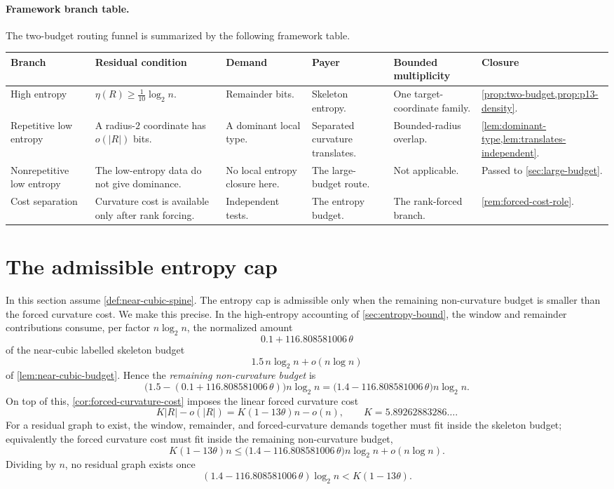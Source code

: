 \documentclass[11pt]{article}
\newcommand{\FrameworkBranchTableHeader}{%
\toprule
\textbf{Branch} & \textbf{Residual condition} & \textbf{Demand} & \textbf{Payer} & \textbf{Bounded multiplicity} & \textbf{Closure}\\
\midrule
}
\begin{document}
\paragraph{Framework branch table.}
The two-budget routing funnel is summarized by the following framework table.
\begin{longtable}{L{0.13\textwidth} L{0.19\textwidth} L{0.14\textwidth} L{0.14\textwidth} L{0.17\textwidth} L{0.17\textwidth}}
\FrameworkBranchTableHeader
High entropy
&
\(\eta(R)\ge\frac1{10}\log_2 n\).
&
Remainder bits.
&
Skeleton entropy.
&
One target-coordinate family.
&
\cref{prop:two-budget,prop:p13-density}.
\\
\addlinespace
Repetitive low entropy
&
A radius-\(2\) coordinate has \(o(|R|)\) bits.
&
A dominant local type.
&
Separated curvature translates.
&
Bounded-radius overlap.
&
\cref{lem:dominant-type,lem:translates-independent}.
\\
\addlinespace
Nonrepetitive low entropy
&
The low-entropy data do not give dominance.
&
No local entropy closure here.
&
The large-budget route.
&
Not applicable.
&
Passed to \cref{sec:large-budget}.
\\
\addlinespace
Cost separation
&
Curvature cost is available only after rank forcing.
&
Independent tests.
&
The entropy budget.
&
The rank-forced branch.
&
\cref{rem:forced-cost-role}.
\\
\bottomrule
\end{longtable}

\section{The admissible entropy cap}

In this section assume \cref{def:near-cubic-spine}.  The entropy cap is
admissible only when the remaining non-curvature budget is smaller than the
forced curvature cost.  We make this precise.  In the high-entropy accounting of
\cref{sec:entropy-bound}, the window and remainder contributions consume, per
factor $n\log_2 n$, the normalized amount
\[
0.1+116.808581006\,\theta
\]
of the near-cubic labelled skeleton budget
\[
1.5\,n\log_2 n+o(n\log n)
\]
of \cref{lem:near-cubic-budget}.  Hence the \emph{remaining non-curvature budget} is
\[
\bigl(1.5-(0.1+116.808581006\,\theta)\bigr)n\log_2 n=\bigl(1.4-116.808581006\,\theta\bigr)n\log_2 n .
\]
On top of this, \cref{cor:forced-curvature-cost} imposes the linear forced curvature cost
\[
K|R|-o(|R|)=K(1-13\theta)n-o(n),\qquad K=5.89262883286\ldots .
\]
For a residual graph to exist, the window, remainder, and forced-curvature demands together must fit inside the skeleton budget; equivalently the forced curvature cost must fit inside the remaining non-curvature budget,
\[
K(1-13\theta)n\le\bigl(1.4-116.808581006\,\theta\bigr)n\log_2 n+o(n\log n).
\]
Dividing by $n$, no residual graph exists once
\begin{equation}\label{eq:entropy-cap}
\left(1.4-116.808581006\,\theta\right)\log_2 n
< K(1-13\theta).
\end{equation}
\end{document}
